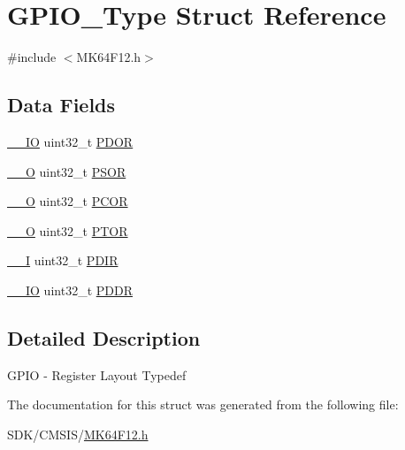 \hypertarget{struct_g_p_i_o___type}{}\section{G\+P\+I\+O\+\_\+\+Type Struct Reference}
\label{struct_g_p_i_o___type}


{\ttfamily \#include $<$M\+K64\+F12.\+h$>$}

\subsection*{Data Fields}
\begin{DoxyCompactItemize}
\item 
\mbox{\hyperlink{core__cm4_8h_aec43007d9998a0a0e01faede4133d6be}{\+\_\+\+\_\+\+IO}} uint32\+\_\+t \mbox{\hyperlink{group___v_r_e_f___peripheral___access___layer_gaef77a53fb6962f329978c788b3c1e637}{P\+D\+OR}}
\item 
\mbox{\hyperlink{core__cm4_8h_a7e25d9380f9ef903923964322e71f2f6}{\+\_\+\+\_\+O}} uint32\+\_\+t \mbox{\hyperlink{group___v_r_e_f___peripheral___access___layer_ga3aa2323e3b596f8c9f191acb2ad7f75d}{P\+S\+OR}}
\item 
\mbox{\hyperlink{core__cm4_8h_a7e25d9380f9ef903923964322e71f2f6}{\+\_\+\+\_\+O}} uint32\+\_\+t \mbox{\hyperlink{group___v_r_e_f___peripheral___access___layer_gac53cb29f8a090565bec5e94b6b808572}{P\+C\+OR}}
\item 
\mbox{\hyperlink{core__cm4_8h_a7e25d9380f9ef903923964322e71f2f6}{\+\_\+\+\_\+O}} uint32\+\_\+t \mbox{\hyperlink{group___v_r_e_f___peripheral___access___layer_ga1c26bce9144a9606d3f8a60dc750b063}{P\+T\+OR}}
\item 
\mbox{\hyperlink{core__cm4_8h_af63697ed9952cc71e1225efe205f6cd3}{\+\_\+\+\_\+I}} uint32\+\_\+t \mbox{\hyperlink{group___v_r_e_f___peripheral___access___layer_ga1013b95ac09a1205ba0528ad32ad1edc}{P\+D\+IR}}
\item 
\mbox{\hyperlink{core__cm4_8h_aec43007d9998a0a0e01faede4133d6be}{\+\_\+\+\_\+\+IO}} uint32\+\_\+t \mbox{\hyperlink{group___v_r_e_f___peripheral___access___layer_ga441a96d3febd01d841b24561b4d036a3}{P\+D\+DR}}
\end{DoxyCompactItemize}


\subsection{Detailed Description}
G\+P\+IO -\/ Register Layout Typedef 

The documentation for this struct was generated from the following file\+:\begin{DoxyCompactItemize}
\item 
S\+D\+K/\+C\+M\+S\+I\+S/\mbox{\hyperlink{_m_k64_f12_8h}{M\+K64\+F12.\+h}}\end{DoxyCompactItemize}
